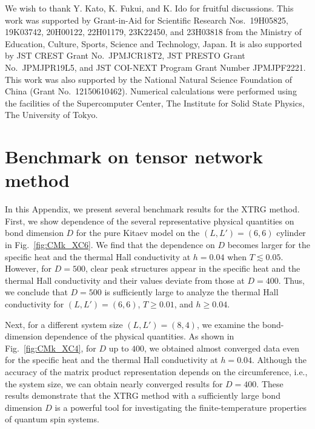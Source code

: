 \documentclass[twocolumn,superscriptaddress,showpacs, longbibliography, aps, prb]{revtex4-2}
\begin{document}
\begin{acknowledgments}
We wish to thank Y. Kato, K. Fukui, and K. Ido for fruitful discussions.
This work was supported by  Grant-in-Aid for Scientific Research
Nos.~19H05825, 19K03742, 20H00122, 	22H01179, 23K22450, and  23H03818 from the Ministry of Education, Culture, Sports, Science and Technology, Japan.
It is also supported by JST CREST Grant No.~JPMJCR18T2, JST PRESTO Grant No.~JPMJPR19L5, and JST COI-NEXT Program Grant Number JPMJPF2221. This work was also supported by the National Natural Science Foundation of China (Grant No.~12150610462). Numerical calculations were performed using the facilities of the Supercomputer Center, The Institute for Solid State Physics, The University of Tokyo.
\end{acknowledgments}

\appendix
\section{Benchmark on tensor network method}
\label{app:XTRG_Bench}
In this Appendix, we present several benchmark %
results for the XTRG method. 
First, we show %
dependence of the several representative 
physical quantities on bond dimension $D$ %
for the pure Kitaev model on the $(L, L') = (6, 6)$ cylinder 
in Fig.~\ref{fig:CMk_XC6}. 
We find that %
the dependence on $D$ becomes larger %
for the specific heat and the thermal Hall conductivity %
at $h=0.04$ when $T \lesssim 0.05$.
However, %
for $D=500$, 
clear peak structures appear in the specific heat and the thermal Hall conductivity %
and their values %
deviate from those %
at $D=400$. 
Thus, we conclude %
that %
$D=500$ is sufficiently large to %
analyze the thermal Hall conductivity %
for $(L, L') = (6, 6)$, $T\geq 0.01$, and $h\geq 0.04$.

Next, for %
a different system size $(L, L') = (8, 4)$, 
we examine the bond-dimension dependence of the physical quantities.
As shown in Fig.~\ref{fig:CMk_XC4}, 
for $D$ up to $400$, we obtained almost converged data even for the specific heat and the thermal Hall conductivity at $h=0.04$. 
Although the accuracy of the matrix product representation depends on the circumference, i.e., the system size, we can obtain %
nearly converged results
for $D=400$. These results demonstrate that the XTRG method with a sufficiently large bond dimension
$D$ is a powerful tool for investigating the finite-temperature properties of quantum spin systems.
\end{document}
